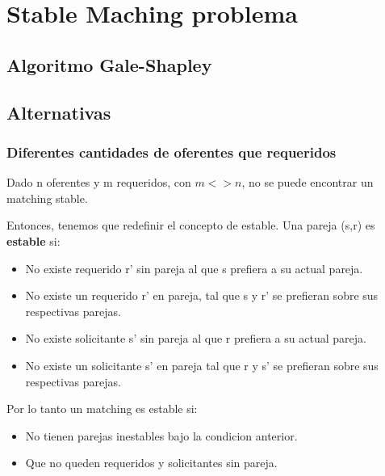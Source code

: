\documentclass{article}
\begin{document}
\newpage{}
\tableofcontents
\newpage{}

\newpage
\section{Stable Maching problema}

\subsection{Algoritmo Gale-Shapley}
\subsection{Alternativas}
\subsubsection{Diferentes cantidades de oferentes que requeridos}

Dado n oferentes y m requeridos, con \(m <> n\), no se puede encontrar un matching stable. 

Entonces, tenemos que redefinir el concepto de estable. Una pareja (s,r) es \textbf{estable} si:
\begin{itemize}
    \item No existe requerido r' sin pareja al que s prefiera a su actual pareja.
    \item No existe un requerido r' en pareja, tal que s y r' se prefieran sobre sus respectivas parejas.
    \item No existe solicitante s' sin pareja al que r prefiera a su actual pareja.
    \item No existe un solicitante s' en pareja tal que r y s' se prefieran sobre sus respectivas parejas.
\end{itemize}    


Por lo tanto un matching es estable si:
\begin{itemize}
    \item No tienen parejas inestables bajo la condicion anterior.
    \item Que no queden requeridos y solicitantes sin pareja.
\end{itemize}
\end{document}

